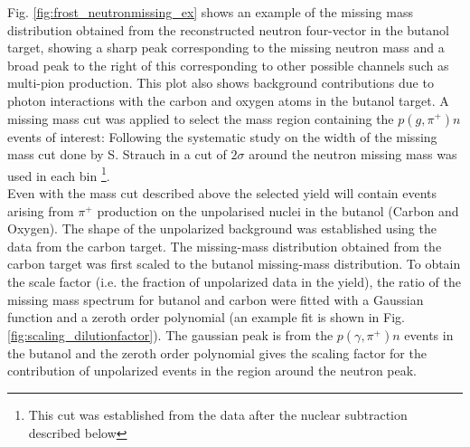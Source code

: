Fig. \ref{fig:frost_neutronmissing_ex} shows an example of the missing mass distribution obtained from the reconstructed neutron four-vector in the butanol target, showing a sharp peak corresponding to the missing neutron mass and a broad peak to the right of this corresponding to other possible channels such as multi-pion production. This plot also shows background contributions due to photon interactions with the carbon and oxygen atoms in the butanol target.
A missing mass cut was applied to select the mass region containing the $p(g,\pi^+)n$ events of interest: Following the systematic study on the width of the missing mass cut done by S. Strauch in \cite{Strauch_2014} a cut of $2 \sigma$ around the neutron missing mass was used in each bin \footnote{This cut was established from the data after the nuclear subtraction described below}. \\
Even with the mass cut described above the selected yield will contain events arising from $\pi^+$ production on the unpolarised nuclei in the butanol (Carbon and Oxygen). The shape of the unpolarized background was established using the data from the carbon target. 
 The missing-mass distribution obtained from the carbon target was first scaled to the butanol missing-mass distribution. To obtain the scale factor (i.e. the fraction of unpolarized data in the yield), the ratio of the  missing mass spectrum for butanol and carbon were fitted with a Gaussian function and a zeroth order polynomial (an example fit  is shown in Fig. \ref{fig:scaling_dilutionfactor}). The gaussian peak is from the $p(\gamma,\pi^+)n$ events in the butanol and the zeroth order polynomial gives the scaling factor for the contribution of unpolarized events in the region around the neutron peak. \\
